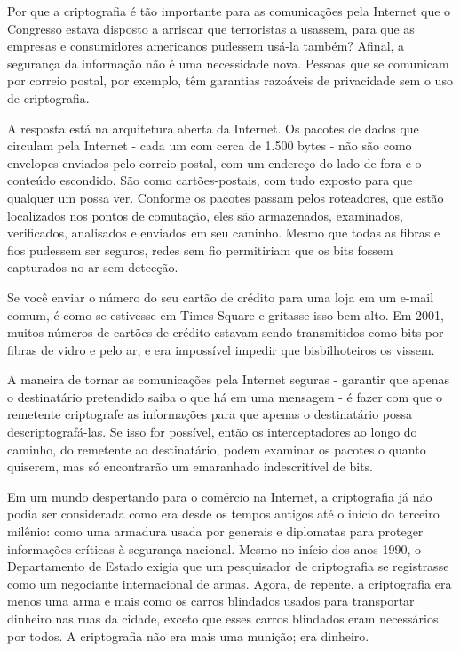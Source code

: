 \documentclass{book}
\begin{document}
Por que a criptografia é tão importante para as comunicações pela Internet que o Congresso estava disposto a arriscar que terroristas a usassem, para que as empresas e consumidores americanos pudessem usá-la também? Afinal, a segurança da informação não é uma necessidade nova. Pessoas que se comunicam por correio postal, por exemplo, têm garantias razoáveis de privacidade sem o uso de criptografia.

A resposta está na arquitetura aberta da Internet. Os pacotes de dados que circulam pela Internet - cada um com cerca de 1.500 bytes - não são como envelopes enviados pelo correio postal, com um endereço do lado de fora e o conteúdo escondido. São como cartões-postais, com tudo exposto para que qualquer um possa ver. Conforme os pacotes passam pelos roteadores, que estão localizados nos pontos de comutação, eles são armazenados, examinados, verificados, analisados ​​e enviados em seu caminho. Mesmo que todas as fibras e fios pudessem ser seguros, redes sem fio permitiriam que os bits fossem capturados no ar sem detecção.

Se você enviar o número do seu cartão de crédito para uma loja em um e-mail comum, é como se estivesse em Times Square e gritasse isso bem alto. Em 2001, muitos números de cartões de crédito estavam sendo transmitidos como bits por fibras de vidro e pelo ar, e era impossível impedir que bisbilhoteiros os vissem.

A maneira de tornar as comunicações pela Internet seguras - garantir que apenas o destinatário pretendido saiba o que há em uma mensagem - é fazer com que o remetente criptografe as informações para que apenas o destinatário possa descriptografá-las. Se isso for possível, então os interceptadores ao longo do caminho, do remetente ao destinatário, podem examinar os pacotes o quanto quiserem, mas só encontrarão um emaranhado indescritível de bits.

Em um mundo despertando para o comércio na Internet, a criptografia já não podia ser considerada como era desde os tempos antigos até o início do terceiro milênio: como uma armadura usada por generais e diplomatas para proteger informações críticas à segurança nacional. Mesmo no início dos anos 1990, o Departamento de Estado exigia que um pesquisador de criptografia se registrasse como um negociante internacional de armas. Agora, de repente, a criptografia era menos uma arma e mais como os carros blindados usados para transportar dinheiro nas ruas da cidade, exceto que esses carros blindados eram necessários por todos. A criptografia não era mais uma munição; era dinheiro.
\end{document}
